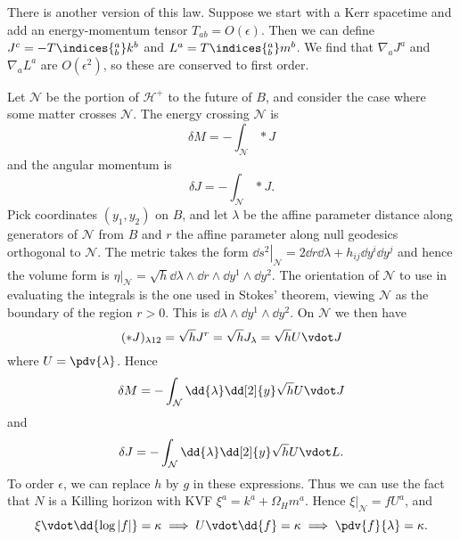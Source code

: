 \documentclass{jknotes}
\begin{document}
There is another version of this law. Suppose we start with a Kerr spacetime and add an energy-momentum tensor \(T_{ab}=O(\epsilon)\). Then we can define \(J^c = -T\indices{^a_b}k^b\) and \(L^a = T\indices{^a_b}m^b\). We find that \(\nabla_a J^a\) and \(\nabla_a L^a\) are \(O(\epsilon^2)\), so these are conserved to first order.

Let \(\mathcal{N}\) be the portion of \(\mathcal{H}^+\) to the future of \(B\), and consider the case where some matter crosses \(\mathcal{N}\). The energy crossing \(\mathcal{N}\) is
\begin{equation}
    \delta M = -\int_{\mathcal{N}} *J
\end{equation}
and the angular momentum is
\begin{equation}
    \delta J = -\int_{\mathcal{N}} *J.
\end{equation}
Pick coordinates \((y_1,y_2)\) on \(B\), and let \(\lambda\) be the affine parameter distance along generators of \(\mathcal{N}\) from \(B\) and \(r\) the affine parameter along null geodesics orthogonal to \(\mathcal{N}\). The metric takes the form \(\left.\dd{s}^2\right|_{\mathcal{N}} = 2\dd{r}\dd{\lambda}+h_{ij}\dd{y^i}\dd{y^j}\) and hence the volume form is \(\left.\eta\right|_{\mathcal{N}} = \sqrt{h}\dd{\lambda}\wedge\dd{r}\wedge\dd{y^1}\wedge\dd{y^2}\). The orientation of \(\mathcal{N}\) to use in evaluating the integrals is the one used in Stokes' theorem, viewing \(\mathcal{N}\) as the boundary of the region \(r>0\). This is \(\dd{\lambda}\wedge\dd{y^1}\wedge\dd{y^2}\). On \(\mathcal{N}\) we then have
\begin{equation}
    (*J)_{\lambda 12} = \sqrt{h}J^r = \sqrt{h}J_\lambda = \sqrt{h}U\vdot J
\end{equation}
where \(U = \pdv{\lambda}\). Hence
\begin{equation}
    \delta M = -\int_{\mathcal{N}}\dd{\lambda}\dd[2]{y} \sqrt{h}U\vdot J
\end{equation}
and
\begin{equation}
    \delta J = -\int_{\mathcal{N}}\dd{\lambda}\dd[2]{y} \sqrt{h}U\vdot L.
\end{equation}
To order \(\epsilon\), we can replace \(h\) by \(g\) in these expressions. Thus we can use the fact that \(N\) is a Killing horizon with KVF \(\xi^a=k^a+\Omega_H m^a\). Hence \(\left.\xi\right|_{\mathcal{N}}=fU^a\), and
\begin{equation}
    \xi\vdot\dd{\log|f|}=\kappa \implies U\vdot\dd{f}=\kappa \implies \pdv{f}{\lambda}=\kappa. 
\end{equation}
\end{document}
